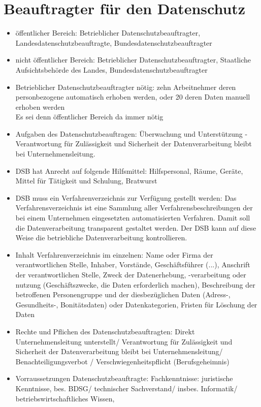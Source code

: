 \documentclass[a4paper,10pt]{scrartcl}
\begin{document}
\section{Beauftragter für den Datenschutz}
\begin{itemize}
 \item öffentlicher Bereich: Betrieblicher Datenschutzbeauftragter, Landesdatenschutzbeauftragte, Bundesdatenschutzbeauftragter  
 \item nicht öffentlicher Bereich: Betrieblicher Datenschutzbeauftragter, Staatliche Aufsichtsbehörde des Landes, Bundesdatenschutzbeauftragter
 \item Betrieblicher Datenschutzbeauftragter nötig: zehn Arbeitnehmer deren personbezogene automatisch erhoben werden, oder 20 deren Daten manuell erhoben werden\\
 Es sei denn öffentlicher Bereich da immer nötig
 \item Aufgaben des Datenschutzbeauftragen: Überwachung und Unterstützung - Verantwortung für Zulässigkeit und Sicherheit der 
Datenverarbeitung bleibt bei Unternehmensleitung.
 \item DSB hat Anrecht auf folgende Hilfsmittel: Hilfspersonal, Räume, Geräte, Mittel für Tätigkeit und Schulung, Bratwurst
 \item DSB muss ein Verfahrenverzeichnis zur Verfügung gestellt werden: Das Verfahrensverzeichnis ist eine Sammlung aller 
Verfahrensbeschreibungen der bei einem Unternehmen eingesetzten 
automatisierten Verfahren.  Damit soll die Datenverarbeitung 
transparent gestaltet werden. Der DSB kann auf diese Weise die 
betriebliche Datenverarbeitung kontrollieren.
\item Inhalt Verfahrenverzeichnis im einzelnen: Name oder Firma der verantwortlichen Stelle, Inhaber, Vorstände, Geschäftsführer (...), Anschrift der verantwortlichen Stelle,
Zweck der Datenerhebung, -verarbeitung oder nutzung (Geschäftszwecke, die Daten erforderlich machen), Beschreibung der betroffenen Personengruppe und der 
            diesbezüglichen Daten (Adress-, Gesundheits-,  
            Bonitätsdaten) oder Datenkategorien, Fristen für Löschung der Daten
\item Rechte und Pflichen des Datenschutzbeauftragten: Direkt Unternehmensleitung unterstellt/ Verantwortung für Zulässigkeit und Sicherheit der          
    Datenverarbeitung bleibt bei Unternehmensleitung/ Benachteiligungsverbot / Verschwiegenheitspflicht (Berufsgeheimnis)
    \item Vorraussetzungen Datenschutzbeauftragte: Fachkenntnisse: juristische Kenntnisse, bes. BDSG/  technischer Sachverstand/ insbes. Informatik/ betriebswirtschaftliches Wissen,

\end{itemize}
\end{document}
